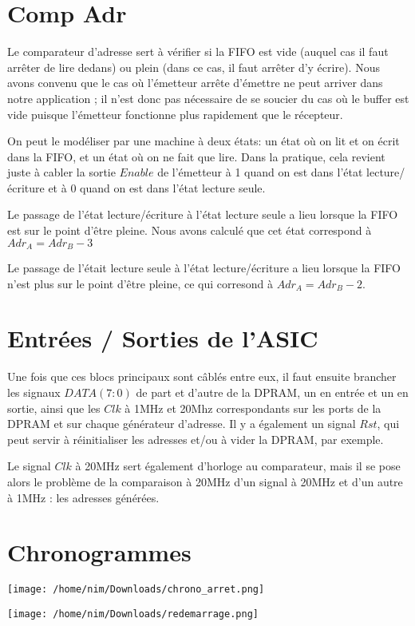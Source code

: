\documentclass{article}
\begin{document}
\section{Comp Adr}

Le comparateur d’adresse sert à vérifier si la FIFO est vide (auquel cas il faut arrêter de lire dedans) ou plein (dans ce cas, il faut arrêter d’y écrire). Nous avons convenu que le cas où l’émetteur arrête d’émettre ne peut arriver dans notre application ; il n’est donc pas nécessaire de se soucier du cas où le buffer est vide puisque l’émetteur fonctionne plus rapidement que le récepteur.

On peut le modéliser par une machine à deux états: un état où on lit et on écrit dans la FIFO, et un état où on ne fait que lire. Dans la pratique, cela revient juste à cabler la sortie $Enable$ de l’émetteur à 1 quand on est dans l’état lecture/écriture et à 0 quand on est dans l’état lecture seule.

Le passage de l’état lecture/écriture à l’état lecture seule a lieu lorsque la FIFO est sur le point d’être pleine. Nous avons calculé que cet état correspond à $Adr_A = Adr_B - 3$

Le passage de l’était lecture seule à l’état lecture/écriture a lieu lorsque la FIFO n’est plus sur le point d’être pleine, ce qui corresond à $Adr_A = Adr_B - 2$.

\section{Entrées / Sorties de l’ASIC}

Une fois que ces blocs principaux sont câblés entre eux, il faut ensuite brancher les signaux $DATA(7:0)$ de part et d’autre de la DPRAM, un en entrée et un en sortie, ainsi que les $Clk$ à 1MHz et 20Mhz correspondants sur les ports de la DPRAM et sur chaque générateur d’adresse. Il y a également un signal $Rst$, qui peut servir à réinitialiser les adresses et/ou à vider la DPRAM, par exemple.

Le signal $Clk$ à 20MHz sert également d’horloge au comparateur, mais il se pose alors le problème de la comparaison à 20MHz d’un signal à 20MHz et d’un autre à 1MHz : les adresses générées.

\section{Chronogrammes}

\texttt{[image: /home/nim/Downloads/chrono\_arret.png]}

\texttt{[image: /home/nim/Downloads/redemarrage.png]}
\end{document}
